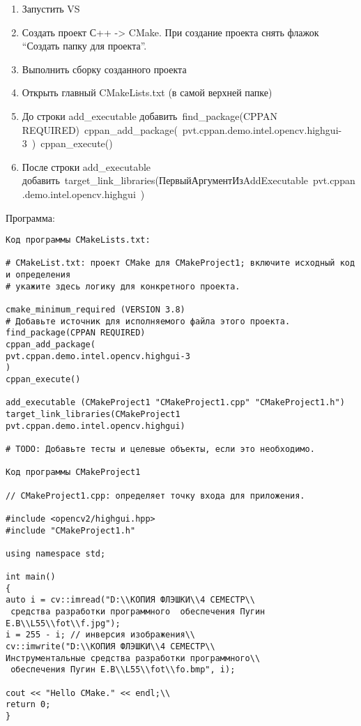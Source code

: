 \begin{enumerate}	
\item Запустить VS
\item Создать проект С++ -> CMake. При создание проекта снять флажок “Создать папку для проекта”.
\item Выполнить сборку созданного проекта	\item Открыть главный CMakeLists.txt (в самой верхней папке)
\item До строки add\_executable добавить\
	find\_package(CPPAN REQUIRED)\
	cppan\_add\_package(\
	pvt.cppan.demo.intel.opencv.highgui-3\
	)\
	cppan\_execute()\
\item После строки add\_executable добавить\
target\_link\_libraries(ПервыйАргументИзAddExecutable\ pvt.cppan.demo.intel.opencv.highgui\
	)\	
\end{enumerate}
\begin{center}
Программа:
\end{center}
\begingroup
\fontsize{12pt}{12pt}\selectfont
\begin{verbatim}
Код программы CMakeLists.txt:

# CMakeList.txt: проект CMake для CMakeProject1; включите исходный код и определения
# укажите здесь логику для конкретного проекта.

cmake_minimum_required (VERSION 3.8)
# Добавьте источник для исполняемого файла этого проекта.
find_package(CPPAN REQUIRED)
cppan_add_package(
pvt.cppan.demo.intel.opencv.highgui-3
)
cppan_execute()

add_executable (CMakeProject1 "CMakeProject1.cpp" "CMakeProject1.h")
target_link_libraries(CMakeProject1 pvt.cppan.demo.intel.opencv.highgui)

# TODO: Добавьте тесты и целевые объекты, если это необходимо.

Код программы CMakeProject1

// CMakeProject1.cpp: определяет точку входа для приложения.

#include <opencv2/highgui.hpp>
#include "CMakeProject1.h"

using namespace std;

int main()
{
auto i = cv::imread("D:\\КОПИЯ ФЛЭШКИ\\4 СЕМЕСТР\\
 средства разработки программного  обеспечения Пугин Е.В\\L55\\fot\\f.jpg");
i = 255 - i; // инверсия изображения\\
cv::imwrite("D:\\КОПИЯ ФЛЭШКИ\\4 СЕМЕСТР\\
Инструментальные средства разработки программного\\
 обеспечения Пугин Е.В\\L55\\fot\\fo.bmp", i);

cout << "Hello CMake." << endl;\\
return 0;
}
\end{verbatim}
